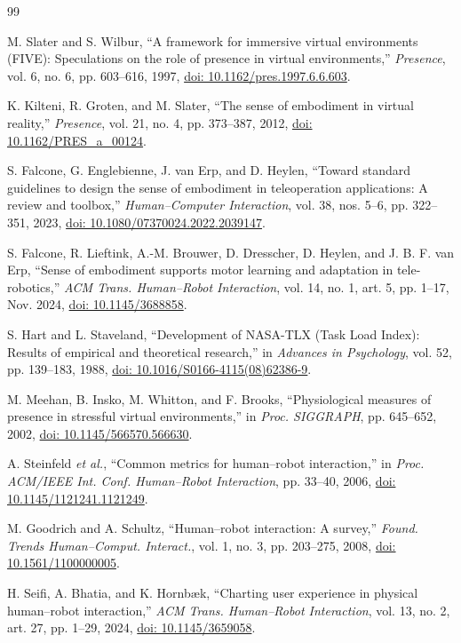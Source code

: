 \documentclass[letterpaper,10pt,conference]{ieeeconf}
\newcommand{\doi}[1]{\href{https://doi.org/#1}{doi: #1}}
\begin{document}
\begin{thebibliography}{99}

M. Slater and S. Wilbur, ``A framework for immersive virtual environments (FIVE): Speculations on the role of presence in virtual environments,'' \emph{Presence}, vol. 6, no. 6, pp. 603--616, 1997, \doi{10.1162/pres.1997.6.6.603}.

K. Kilteni, R. Groten, and M. Slater, ``The sense of embodiment in virtual reality,'' \emph{Presence}, vol. 21, no. 4, pp. 373--387, 2012, \doi{10.1162/PRES\_a\_00124}.

S. Falcone, G. Englebienne, J. van Erp, and D. Heylen, ``Toward standard guidelines to design the sense of embodiment in teleoperation applications: A review and toolbox,'' \emph{Human--Computer Interaction}, vol. 38, nos. 5--6, pp. 322--351, 2023, \doi{10.1080/07370024.2022.2039147}.

S. Falcone, R. Lieftink, A.-M. Brouwer, D. Dresscher, D. Heylen, and J. B. F. van Erp, ``Sense of embodiment supports motor learning and adaptation in tele-robotics,'' \emph{ACM Trans. Human--Robot Interaction}, vol. 14, no. 1, art. 5, pp. 1--17, Nov. 2024, \doi{10.1145/3688858}.

S. Hart and L. Staveland, ``Development of NASA-TLX (Task Load Index): Results of empirical and theoretical research,'' in \emph{Advances in Psychology}, vol. 52, pp. 139--183, 1988, \doi{10.1016/S0166-4115(08)62386-9}.

M. Meehan, B. Insko, M. Whitton, and F. Brooks, ``Physiological measures of presence in stressful virtual environments,'' in \emph{Proc. SIGGRAPH}, pp. 645--652, 2002, \doi{10.1145/566570.566630}.

A. Steinfeld \emph{et al.}, ``Common metrics for human--robot interaction,'' in \emph{Proc. ACM/IEEE Int. Conf. Human--Robot Interaction}, pp. 33--40, 2006, \doi{10.1145/1121241.1121249}.

M. Goodrich and A. Schultz, ``Human--robot interaction: A survey,'' \emph{Found. Trends Human--Comput. Interact.}, vol. 1, no. 3, pp. 203--275, 2008, \doi{10.1561/1100000005}.

H. Seifi, A. Bhatia, and K. Hornb{\ae}k, ``Charting user experience in physical human--robot interaction,'' \emph{ACM Trans. Human--Robot Interaction}, vol. 13, no. 2, art. 27, pp. 1--29, 2024, \doi{10.1145/3659058}.


\end{thebibliography}
\end{document}
